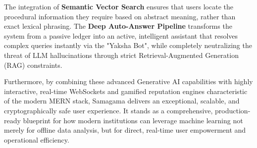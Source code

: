 \documentclass[12pt,a4paper]{article}
\begin{document}
The integration of \textbf{Semantic Vector Search} ensures that users locate the procedural information they require based on abstract meaning, rather than exact lexical phrasing. The \textbf{Deep Auto-Answer Pipeline} transforms the system from a passive ledger into an active, intelligent assistant that resolves complex queries instantly via the "Yaksha Bot", while completely neutralizing the threat of LLM hallucinations through strict Retrieval-Augmented Generation (RAG) constraints. 

Furthermore, by combining these advanced Generative AI capabilities with highly interactive, real-time WebSockets and gamified reputation engines characteristic of the modern MERN stack, Samagama delivers an exceptional, scalable, and cryptographically safe user experience. It stands as a comprehensive, production-ready blueprint for how modern institutions can leverage machine learning not merely for offline data analysis, but for direct, real-time user empowerment and operational efficiency.
\end{document}
